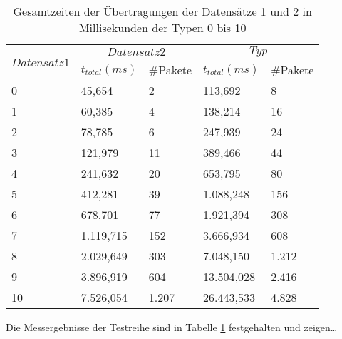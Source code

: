 \begin{table}[H]
\begin{center}
    \begin{tabular}{| l | l | l | l | l |}
    \hline
    \multirow{2}{*}{$Datensatz 1$} & \multicolumn{2}{|c|}{$Datensatz 2$}  &
    \multicolumn{2}{|c|}{$Typ$} \\
    \cline{2-5}
    & $t_{total}(ms)$ & \#Pakete & $t_{total}(ms)$ & \#Pakete \\    		
    \hline 
    0 & 45,654 & 2 & 113,692 & 8 \\ \hline
    1 & 60,385 & 4 & 138,214 & 16 \\ \hline
    2 & 78,785 & 6 & 247,939 & 24 \\ \hline
    3 & 121,979 & 11 & 389,466 & 44 \\ \hline
    4 & 241,632 & 20 & 653,795 & 80 \\ \hline
    5 & 412,281 & 39 & 1.088,248 & 156 \\ \hline
    6 & 678,701 & 77 & 1.921,394 & 308 \\ \hline
    7 & 1.119,715 & 152 & 3.666,934 & 608 \\ \hline
    8 & 2.029,649 & 303 & 7.048,150 & 1.212 \\ \hline
    9 & 3.896,919 & 604 & 13.504,028 & 2.416 \\ \hline
    10 & 7.526,054 & 1.207 & 26.443,533 & 4.828 \\ \hline
    \end{tabular}
\end{center}
\caption{Gesamtzeiten der Übertragungen der Datensätze 1 und 2 in
Millisekunden der Typen 0 bis 10}
\label{tabelle_uebertragung}
\end{table}

Die Messergebnisse der Testreihe sind in Tabelle \ref{tabelle_uebertragung} festgehalten und zeigen\ldots


